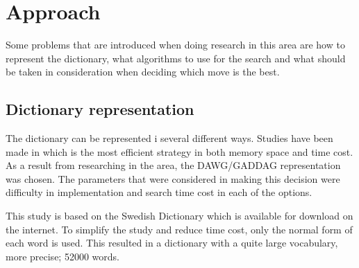 \documentclass[a4paper, 12pt]{report}
\begin{document}
\chapter{Approach}
Some problems that are introduced when doing research in this area are how to represent the dictionary, what algorithms to use for the search and what should be taken in consideration when deciding which move is the best.
\section{Dictionary representation}
The dictionary can be represented i several different ways. Studies have been made in which is the most efficient strategy in both memory space and time cost. As a result from researching in the area, the DAWG/GADDAG representation was chosen. The parameters that were considered in making this decision were difficulty in implementation and search time cost in each of the options.

This study is based on the Swedish Dictionary which is available for download on the internet. To simplify the study and reduce time cost, only the normal form of each word is used. This resulted in a dictionary with a quite large vocabulary, more precise; 52000 words.
\end{document}
